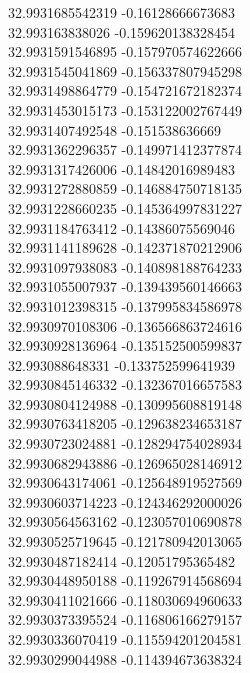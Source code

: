 {32.9931685542319	-0.16128666673683\\
32.993163838026	-0.159620138328454\\
32.9931591546895	-0.157970574622666\\
32.9931545041869	-0.156337807945298\\
32.9931498864779	-0.154721672182374\\
32.9931453015173	-0.153122002767449\\
32.9931407492548	-0.151538636669\\
32.9931362296357	-0.149971412377874\\
32.9931317426006	-0.14842016989483\\
32.9931272880859	-0.146884750718135\\
32.9931228660235	-0.145364997831227\\
32.9931184763412	-0.14386075569046\\
32.9931141189628	-0.142371870212906\\
32.9931097938083	-0.140898188764233\\
32.9931055007937	-0.139439560146663\\
32.9931012398315	-0.137995834586978\\
32.9930970108306	-0.136566863724616\\
32.9930928136964	-0.135152500599837\\
32.993088648331	-0.133752599641939\\
32.9930845146332	-0.132367016657583\\
32.9930804124988	-0.130995608819148\\
32.9930763418205	-0.129638234653187\\
32.9930723024881	-0.128294754028934\\
32.9930682943886	-0.126965028146912\\
32.9930643174061	-0.125648919527569\\
32.9930603714223	-0.124346292000026\\
32.9930564563162	-0.123057010690878\\
32.9930525719645	-0.121780942013065\\
32.9930487182414	-0.12051795365482\\
32.9930448950188	-0.119267914568694\\
32.9930411021666	-0.118030694960633\\
32.9930373395524	-0.116806166279157\\
32.9930336070419	-0.115594201204581\\
32.9930299044988	-0.114394673638324\\
}
